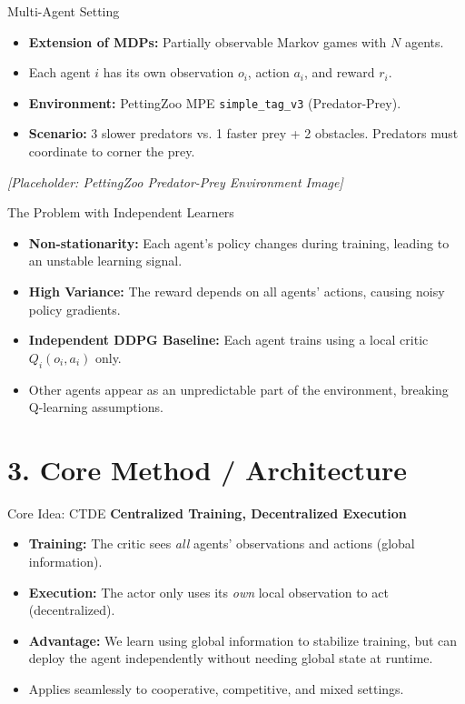 \documentclass[aspectratio=169]{beamer}
\begin{document}
\begin{frame}{Multi-Agent Setting}
    \begin{itemize}
        \item \textbf{Extension of MDPs:} Partially observable Markov games with $N$ agents.
        \item Each agent $i$ has its own observation $o_i$, action $a_i$, and reward $r_i$.
        \item \textbf{Environment:} PettingZoo MPE \texttt{simple\_tag\_v3} (Predator-Prey).
        \item \textbf{Scenario:} 3 slower predators vs. 1 faster prey + 2 obstacles. Predators must coordinate to corner the prey.
    \end{itemize}
    \begin{center}
        \textit{[Placeholder: PettingZoo Predator-Prey Environment Image]}
    \end{center}
\end{frame}

\begin{frame}{The Problem with Independent Learners}
    \begin{itemize}
        \item \textbf{Non-stationarity:} Each agent's policy changes during training, leading to an unstable learning signal.
        \item \textbf{High Variance:} The reward depends on all agents' actions, causing noisy policy gradients.
        \item \textbf{Independent DDPG Baseline:} Each agent trains using a local critic $Q_i(o_i, a_i)$ only.
        \item Other agents appear as an unpredictable part of the environment, breaking Q-learning assumptions.
    \end{itemize}
\end{frame}

\section{3. Core Method / Architecture}

\begin{frame}{Core Idea: CTDE}
    \textbf{Centralized Training, Decentralized Execution}
    \begin{itemize}
        \item \textbf{Training:} The critic sees \textit{all} agents' observations and actions (global information).
        \item \textbf{Execution:} The actor only uses its \textit{own} local observation to act (decentralized).
        \item \textbf{Advantage:} We learn using global information to stabilize training, but can deploy the agent independently without needing global state at runtime.
        \item Applies seamlessly to cooperative, competitive, and mixed settings.
    \end{itemize}
\end{frame}
\end{document}
